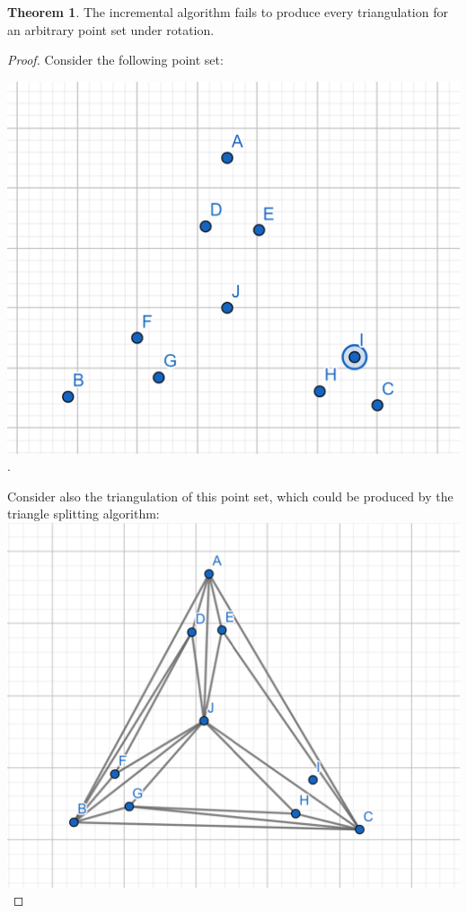 \documentclass[12pt]{article}
\theoremstyle{definition}
\newtheorem{theorem}{Theorem}
\begin{document}
\begin{theorem}
The incremental algorithm fails to produce every triangulation for an arbitrary point set under rotation.
\end{theorem}
\begin{proof}
Consider the following point set: 

\includegraphics[scale=0.5]{point_set.png}.

Consider also the triangulation of this point set, which could be produced by the triangle splitting algorithm:
\includegraphics[scale=0.5]{counterexample.png} 


\end{proof}
\end{document}
